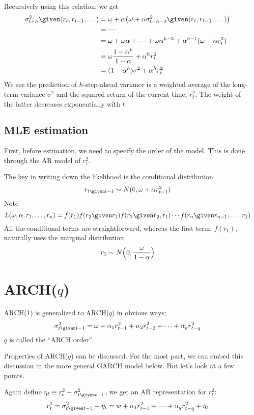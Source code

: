 \documentclass[12pt]{article}
\begin{document}
Recursively using this relation, we get
\[\begin{split}
\sigma^2_{t+h} \given (r_t,r_{t-1},\dotsc)
&= \omega + \alpha\bigl(\omega + \alpha \sigma^2_{t+h-2}
    \given (r_t,r_{t-1},\dotsc)\bigr)
\\
&= \dotsb
\\
&= \omega + \omega \alpha + \dotsb + \omega \alpha^{h-2}
    + \alpha^{h-1} (\omega + \alpha r^2_t)
\\
&= \omega \frac{1 - \alpha^h}{1 - \alpha} + \alpha^h r_t^2
\\
&= (1 - \alpha^h)\sigma^2 + \alpha^h r_t^2
\end{split}
\]
We see the prediction of $h$-step-ahead variance
is a weighted average of the long-term variance $\sigma^2$
and the squared return of the current time, $r^2_t$.
The weight of the latter decreases exponentially with $t$.

\subsection{MLE estimation}

First, before estimation, we need to specify the order of the model.
This is done through the AR model of $r^2_t$.

The key in writing down the likelihood is
the conditional distribution
\[
r_{t\given t-1} \sim N(0, \omega + \alpha r_{t-1}^2)
\]
Note
\[
L(\omega, \alpha; r_1,\dotsc,r_n)
= f(r_1) f(r_2 \given r_1) f(r_3 \given r_2,r_1)
    \dotsb f(r_n \given r_{n-1}, \dotsc, r_1)
\]
All the conditional terms are straightforward,
whereas the first term, $f(r_1)$, naturally uses the marginal
distribution
\[
r_1 \sim N\Bigl(0, \frac{\omega}{1-\alpha}\Bigr)
\]


\section{ARCH($q$)}

ARCH(1) is generalized to ARCH($q$) in obvious ways:
\[
\sigma^2_{t\given t-1}
= \omega + \alpha_1 r_{t-1}^2 + \alpha_2 r_{t-2}^2 +\dotsb+
    \alpha_q r_{t-q}^2
\]
$q$ is called the ``ARCH order''.

Properties of ARCH($q$) can be discussed.
For the most part,
we can embed this discussion in the more general
GARCH model below.
But let's look at a few points.

Again define
$\eta_t \equiv r_t^2 - \sigma^2_{t\given t-1}$,
we get an AR representation for $r_t^2$:
\[
r_t^2
= \sigma^2_{t\given t-1} + \eta_t
= w + \alpha_1 r^2_{t-1} + \dotsb + \alpha_q r^2_{t-q} + \eta_t
\]
\end{document}
